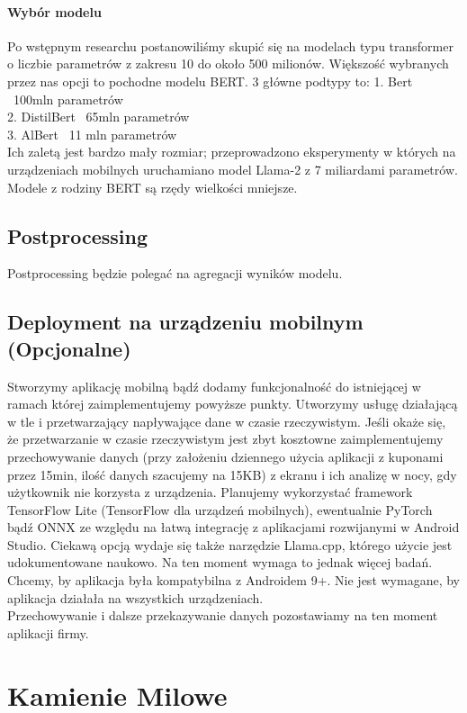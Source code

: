 \documentclass[12pt]{article}
\begin{document}
\paragraph{Wybór modelu}
Po wstępnym researchu postanowiliśmy skupić się na modelach typu transformer o liczbie parametrów z zakresu 10 do około 500 milionów. Większość wybranych przez nas opcji to pochodne modelu BERT\cite{devlin2019bertpretrainingdeepbidirectional}. 3 główne podtypy to:
1. Bert ~100mln parametrów \\
2. DistilBert ~65mln parametrów \\
3. AlBert ~11 mln parametrów \\
Ich zaletą jest bardzo mały rozmiar; przeprowadzono eksperymenty\cite{LLMmobile2024} w których na urządzeniach mobilnych uruchamiano model Llama-2 z 7 miliardami parametrów. Modele z rodziny BERT są rzędy wielkości mniejsze.
\subsection*{Postprocessing}
Postprocessing będzie polegać na agregacji wyników modelu.
\subsection*{Deployment na urządzeniu mobilnym (Opcjonalne)}
Stworzymy aplikację mobilną bądź dodamy funkcjonalność do istniejącej w ramach której zaimplementujemy powyższe punkty. Utworzymy usługę działającą w tle i przetwarzający napływające dane w czasie rzeczywistym. Jeśli okaże się, że przetwarzanie w czasie rzeczywistym jest zbyt kosztowne zaimplementujemy przechowywanie danych (przy założeniu dziennego użycia aplikacji z kuponami przez 15min, ilość danych szacujemy na 15KB) z ekranu i ich analizę w nocy, gdy użytkownik nie korzysta z urządzenia. Planujemy wykorzystać framework TensorFlow Lite (TensorFlow dla urządzeń mobilnych), ewentualnie PyTorch bądź ONNX ze względu na łatwą integrację z aplikacjami rozwijanymi w Android Studio.
Ciekawą opcją wydaje się także narzędzie Llama.cpp, którego użycie jest udokumentowane naukowo\cite{LLMmobile2024}. Na ten moment wymaga to jednak więcej badań. Chcemy, by aplikacja była kompatybilna z Androidem 9+. Nie jest wymagane, by aplikacja działała na wszystkich urządzeniach.\\
Przechowywanie i dalsze przekazywanie danych pozostawiamy na ten moment aplikacji firmy.
\section*{Kamienie Milowe}
\end{document}
